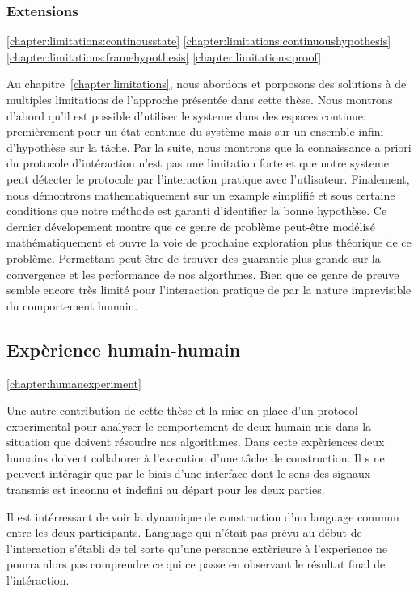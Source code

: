\subsubsection*{Extensions}

\ref{chapter:limitations:continousstate}
\ref{chapter:limitations:continuoushypothesis}
\ref{chapter:limitations:framehypothesis}
\ref{chapter:limitations:proof}


Au chapitre~\ref{chapter:limitations}, nous abordons et porposons des solutions à de multiples limitations de l'approche présentée dans cette thèse. Nous montrons d'abord qu'il est possible d'utiliser le systeme dans des espaces continue: premièrement pour un état continue du système mais sur un ensemble infini d'hypothèse sur la tâche. Par la suite, nous montrons que la connaissance a priori du protocole d'intéraction n'est pas une limitation forte et que notre systeme peut détecter le protocole par l'interaction pratique avec l'utlisateur. Finalement, nous démontrons mathematiquement sur un example simplifié et sous certaine conditions que notre méthode est garanti d'identifier la bonne hypothèse. Ce dernier dévelopement montre que ce genre de problème peut-être modélisé mathématiquement et ouvre la voie de prochaine exploration plus théorique de ce problème. Permettant peut-être de trouver des  guarantie plus grande sur la convergence et les performance de nos algorthmes. Bien que ce genre de preuve semble encore très limité pour l'interaction pratique de par la nature imprevisible du comportement humain.

\subsection*{Expèrience humain-humain}

\ref{chapter:humanexperiment}

Une autre contribution de cette thèse et la mise en place d'un protocol experimental pour analyser le comportement de deux humain mis dans la situation que doivent résoudre nos algorithmes. Dans cette expèriences deux humains doivent collaborer à l'execution d'une tâche de construction. Il s ne peuvent intéragir que par le biais d'une interface dont le sens des signaux transmis est inconnu et indefini au départ pour les deux parties.

Il est intérressant de voir la dynamique de construction d'un language commun entre les deux participants. Language qui n'était pas prévu au début de l'interaction s'établi de tel sorte qu'une personne extèrieure à l'experience ne pourra alors pas comprendre ce qui ce passe en observant le résultat final de l'intéraction.

